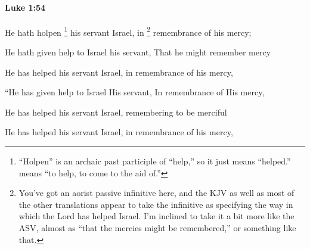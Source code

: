 		\paragraph{Luke 1:54} %
			\label{LUKE-1-54}

			He hath holpen%
				\footnote{%
					``Holpen'' is an archaic past participle of ``help,'' so it just means ``helped.''  means ``to help, to come to the aid of.'' 
					}
			his servant Israel, in%
				\footnote{%
					You've got an aorist passive infinitive here, and the KJV as well as most of the other translations appear to take the infinitive as specifying the way in which the Lord has helped Israel. I'm inclined to take it a bit more like the ASV, almost as ``that the mercies might be remembered,'' or something like that.
					}
			remembrance of his mercy;

			\begin{framed}
			\scriptsize
				\begin{compactdesc}
					\item[SBLG] 
					\item[ASV] He hath given help to Israel his servant, That he might remember mercy
					\item[ESV] He has helped his servant Israel, in remembrance of his mercy,
					\item[NASB] ``He has given help to Israel His servant, In remembrance of His mercy,
					\item[NIV] He has helped his servant Israel, remembering to be merciful
					\item[NRSV] He has helped his servant Israel, in remembrance of his mercy,
				\end{compactdesc}
			\end{framed}

